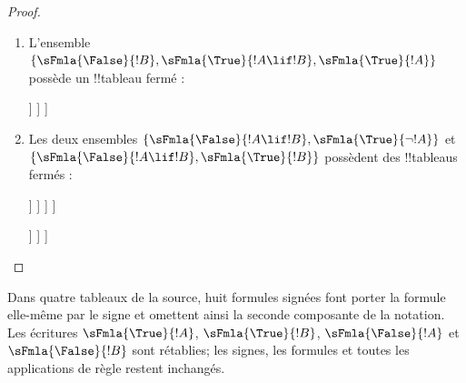 \documentclass[11pt,a4paper,openany]{memoir}
\begin{document}
\begin{proof}
  \begin{enumerate}
    \item L'ensemble $\{\sFmla{\False}{!B},
      \sFmla{\True}{!A \lif !B}, \sFmla{\True}{!A}\}$ possède un
      !!{tableau} fermé :
      \begin{oltableau}
        [\sFmla{\False}{\formula{B}}, just=\TAss
          [\sFmla{\True}{\formula{A} \lif \formula{B}}, just=\TAss
            [\sFmla{\True}{\formula{A}}, just=\TAss
              [\sFmla{\False}{\formula{A}}, just = {\TRule{\True}{\lif}[2]}, close]
              [\sFmla{\True}{\formula{B}}, just = {\TRule{\True}{\lif}[2]}, close]
            ]
          ]
        ]
      \end{oltableau}
    \item Les deux ensembles $\{\sFmla{\False}{!A \lif !B},
      \sFmla{\True}{\lnot !A}\}$ et $\{\sFmla{\False}{!A \lif !B},
      \sFmla{\True}{!B}\}$ possèdent des !!{tableau}s fermés :
      \begin{oltableau}
        [\sFmla{\False}{\formula{A} \lif \formula{B}}, just = \TAss
          [\sFmla{\True}{\lnot \formula{A}}, just = \TAss
            [\sFmla{\True}{\formula{A}}, just = {\TRule{\False}{\lif}[1]}
              [\sFmla{\False}{\formula{B}}, just = {\TRule{\False}{\lif}[1]}
                [\sFmla{\False}{\formula{A}}, just = {\TRule{\True}{\lnot}[2]}, close]
              ]
            ]
          ]
        ]
      \end{oltableau}
      \begin{oltableau}
        [\sFmla{\False}{\formula{A} \lif \formula{B}}, just = \TAss
          [\sFmla{\True}{\formula{B}}, just = \TAss
            [\sFmla{\True}{\formula{A}}, just = {\TRule{\False}{\lif}[1]}
              [\sFmla{\False}{\formula{B}}, just = {\TRule{\False}{\lif}[1]},close
              ]
            ]
          ]
        ]
      \end{oltableau}
  \end{enumerate}
\end{proof}

\begin{editorial}
Dans quatre tableaux de la source, huit formules signées font porter la
formule elle-même par le signe et omettent ainsi la seconde composante
de la notation. Les écritures $\sFmla{\True}{!A}$,
$\sFmla{\True}{!B}$, $\sFmla{\False}{!A}$ et
$\sFmla{\False}{!B}$ sont rétablies; les signes, les formules et toutes
les applications de règle restent inchangés.
\end{editorial}
\end{document}
